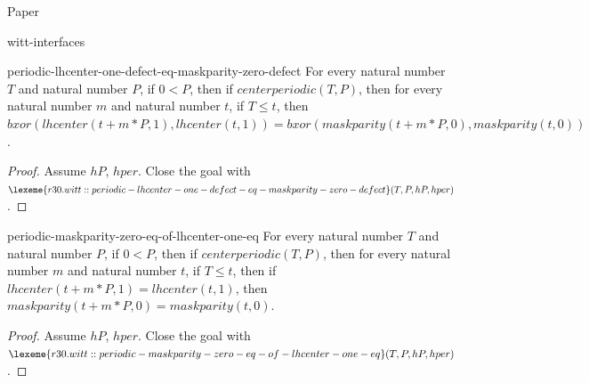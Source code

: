 \begin{lexlean}{Paper}
\begin{section}{witt-interfaces}
  \begin{theorem}{periodic-lhcenter-one-defect-eq-maskparity-zero-defect}
  For every natural number \(T\) and natural number \(P\), if \(0 < P\), then if \(centerperiodic(T, P)\), then for every natural number \(m\) and natural number \(t\), if \(T ≤ t\), then \(bxor(lhcenter(t + m * P, 1), lhcenter(t, 1)) = bxor(maskparity(t + m * P, 0), maskparity(t, 0))\).
  \begin{proof}
  Assume \(hP\), \(hper\).
  Close the goal with \(\lexeme{r30.witt::periodic-lhcenter-one-defect-eq-maskparity-zero-defect}(T, P, hP, hper)\).
  \end{proof}
  \end{theorem}

  \begin{theorem}{periodic-maskparity-zero-eq-of-lhcenter-one-eq}
  For every natural number \(T\) and natural number \(P\), if \(0 < P\), then if \(centerperiodic(T, P)\), then for every natural number \(m\) and natural number \(t\), if \(T ≤ t\), then if \(lhcenter(t + m * P, 1) = lhcenter(t, 1)\), then \(maskparity(t + m * P, 0) = maskparity(t, 0)\).
  \begin{proof}
  Assume \(hP\), \(hper\).
  Close the goal with \(\lexeme{r30.witt::periodic-maskparity-zero-eq-of-lhcenter-one-eq}(T, P, hP, hper)\).
  \end{proof}
  \end{theorem}


\end{section}
\end{lexlean}
